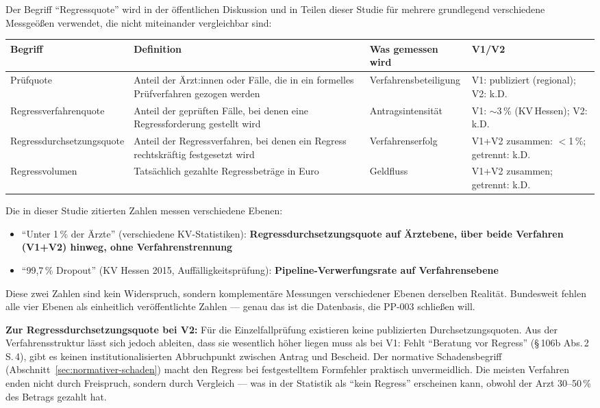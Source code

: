 \documentclass{umbruch-position}
\begin{document}
Der Begriff ``Regressquote'' wird in der öffentlichen Diskussion und in Teilen dieser Studie für mehrere grundlegend verschiedene Messgeößen verwendet, die nicht miteinander vergleichbar sind:

{\small
\begin{tabularx}{\textwidth}{p{2.8cm} X X p{3.5cm}}
\toprule
\textbf{Begriff} & \textbf{Definition} & \textbf{Was gemessen wird} & \textbf{V1/V2} \\
\midrule
Prüfquote & Anteil der Ärzt:innen oder Fälle, die in ein formelles Prüfverfahren gezogen werden & Verfahrens\-beteiligung & V1: publiziert (regional); V2: k.D. \\
\addlinespace
Regress\-verfahren\-quote & Anteil der geprüften Fälle, bei denen eine Regress\-forderung gestellt wird & Antrags\-intensität & V1: $\sim$3\,\% (KV\,Hessen); V2: k.D. \\
\addlinespace
Regress\-durch\-setzungs\-quote & Anteil der Regress\-verfahren, bei denen ein Regress rechts\-kräftig festgesetzt wird & Verfahrens\-erfolg & V1+V2 zusammen: $<$1\,\%; getrennt: k.D. \\
\addlinespace
Regress\-volumen & Tatsächlich gezahlte Regress\-beträge in Euro & Geldfluss & V1+V2 zusammen; getrennt: k.D. \\
\bottomrule
\end{tabularx}
}

Die in dieser Studie zitierten Zahlen messen verschiedene Ebenen:

\begin{itemize}[nosep]
  \item ``Unter 1\,\% der Ärzte'' (verschiedene KV-Statistiken): \textbf{Regressdurchsetzungsquote auf Ärztebene, über beide Verfahren (V1+V2) hinweg, ohne Verfahrenstrennung}
  \item ``99,7\,\% Dropout'' (KV Hessen 2015, Auffälligkeitsprüfung): \textbf{Pipeline-Verwerfungsrate auf Verfahrensebene}
\end{itemize}

Diese zwei Zahlen sind kein Widerspruch, sondern komplementäre Messungen verschiedener Ebenen derselben Realität. Bundesweit fehlen alle vier Ebenen als einheitlich veröffentlichte Zahlen --- genau das ist die Datenbasis, die PP-003 schließen will.

\textbf{Zur Regressdurchsetzungsquote bei V2:} Für die Einzelfallprüfung existieren keine publizierten Durchsetzungsquoten. Aus der Verfahrensstruktur lässt sich jedoch ableiten, dass sie wesentlich höher liegen muss als bei V1: Fehlt ``Beratung vor Regress'' (\S\,106b Abs.\,2 S.\,4), gibt es keinen institutionalisierten Abbruchpunkt zwischen Antrag und Bescheid. Der normative Schadensbegriff (Abschnitt~\ref{sec:normativer-schaden}) macht den Regress bei festgestelltem Formfehler praktisch unvermeidlich. Die meisten Verfahren enden nicht durch Freispruch, sondern durch Vergleich --- was in der Statistik als ``kein Regress'' erscheinen kann, obwohl der Arzt 30--50\,\% des Betrags gezahlt hat.
\end{document}
